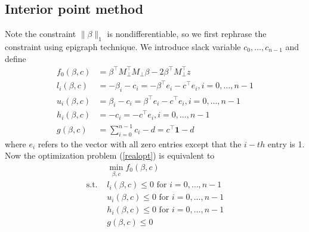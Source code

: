 \documentclass[final,onefignum,onetabnum]{siamart190516}
\begin{document}
\subsection{Interior point method}
Note the constraint $\|\beta\|_1$ is nondifferentiable, so we first rephrase the constraint using epigraph technique. We introduce slack variable $c_0,\dots,c_{n-1}$ and define
\begin{equation}\label{func_val}
    \begin{aligned}
        f_0(\beta, c) &= \beta^\top M_{\perp}^\top M_{\perp}\beta-2\beta^\top M_{\perp}^\top z \\
    l_i(\beta, c) &= -\beta_i-c_i = -\beta^\top e_i-c^\top e_i, i = 0,\dots, n-1\\
    u_i(\beta, c) &= \beta_i - c_i = \beta^\top e_i - c^\top e_i, i = 0, \dots, n-1\\    
    h_i(\beta, c) &= -c_i = -c^\top e_i, i = 0, \dots, n-1\\
    g(\beta, c) &= \sum_{i=0}^{n-1} c_i - d = c^\top \mathbf{1} - d
    \end{aligned}
\end{equation}
where $e_i$ refers to the vector with all zero entries except that the $i-th$ entry is 1. Now the optimization problem (\ref{realopt}) is equivalent to
\begin{equation}\label{realopt2}
\begin{aligned}
     &\min_{\beta,c} f_0(\beta,c)   \\
     \text{s.t. } & l_i(\beta, c)\leq 0\text{ for }i=0,\dots,n-1\\
     &u_i(\beta, c)\leq 0\text{ for }i=0,\dots,n-1\\
     &h_i(\beta, c)\leq 0\text{ for }i=0,\dots,n-1\\
     & g(\beta, c)\leq 0
\end{aligned}
\end{equation}
\end{document}
